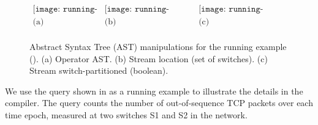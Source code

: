 \begin{figure}
  \centering
  \[
  \begin{array}{ccc}
    \texttt{[image: running-example-AST.pdf]} &
    \texttt{[image: running-example-annotated-AST-2.pdf]} &
    \texttt{[image: running-example-annotated-AST-3.pdf]}
    \\
    \mbox{(a)} & \mbox{(b)} & \mbox{(c)} \\
  \end{array}
  \]
\caption{Abstract Syntax Tree (AST) manipulations for the running example
  (). (a) Operator AST. (b) Stream location (set of switches). (c)
  Stream switch-partitioned (boolean).}
\label{fig:compiler-ast-manipulations}
\end{figure}

We use the query shown in  as a running example to
illustrate the details in the compiler. The query counts the number of
out-of-sequence TCP packets over each time epoch, measured at two switches {\ct
  S1} and {\ct S2} in the network.





